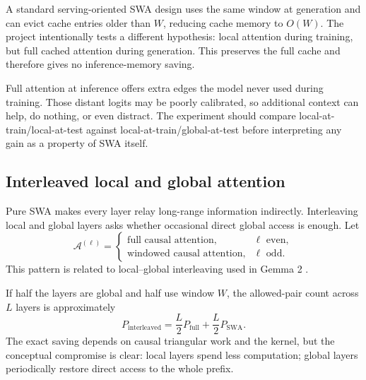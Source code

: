 \documentclass[11pt,a4paper]{article}
\theoremstyle{definition}
\theoremstyle{plain}
\begin{document}
A standard serving-oriented SWA design uses the same window at generation and can evict cache entries older than $W$, reducing cache memory to $O(W)$. The project intentionally tests a different hypothesis: local attention during training, but full cached attention during generation. This preserves the full cache and therefore gives no inference-memory saving.

\begin{tradeoffbox}
Full attention at inference offers extra edges the model never used during training. Those distant logits may be poorly calibrated, so additional context can help, do nothing, or even distract. The experiment should compare local-at-train/local-at-test against local-at-train/global-at-test before interpreting any gain as a property of SWA itself.
\end{tradeoffbox}

\subsection{Interleaved local and global attention}
\label{sec:interleaved-swa}

Pure SWA makes every layer relay long-range information indirectly. Interleaving local and global layers asks whether occasional direct global access is enough. Let
\begin{equation}
    \mathcal{A}^{(\ell)}=\begin{cases}
        \text{full causal attention}, & \ell\text{ even},\\
        \text{windowed causal attention}, & \ell\text{ odd}.
    \end{cases}
\end{equation}
This pattern is related to local--global interleaving used in Gemma 2 \cite{gemma2024}.

If half the layers are global and half use window $W$, the allowed-pair count across $L$ layers is approximately
\begin{equation}
    P_{\mathrm{interleaved}}
    =\frac{L}{2}P_{\mathrm{full}}
     +\frac{L}{2}P_{\mathrm{SWA}}.
\end{equation}
The exact saving depends on causal triangular work and the kernel, but the conceptual compromise is clear: local layers spend less computation; global layers periodically restore direct access to the whole prefix.
\end{document}

